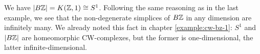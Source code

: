 \begin{example}\label{example:cw-bz-2}
We have $|B{\mathbb Z}|=K({\mathbb Z},1)\cong S^1$. Following the same reasoning as in the last example, we see that the non-degenerate simplices of $B{\mathbb Z}$ in any dimension are infinitely many. We already noted this fact in chapter \ref{example:cw-bz-1}: $S^1$ and $|B{\mathbb Z}|$ are homeomorphic CW-complexes, but the former is one-dimensional, the latter infinite-dimensional.
\end{example}
